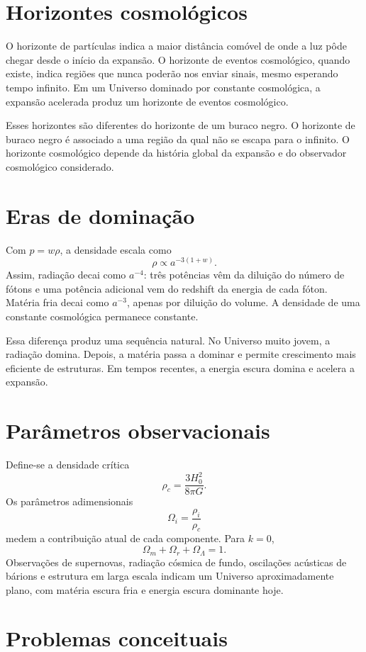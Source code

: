 \documentclass[12pt,a4paper,oneside]{book}
\theoremstyle{rgplain}
\theoremstyle{rgremark}
\begin{document}
\section{Horizontes cosmológicos}

O horizonte de partículas indica a maior distância comóvel de onde a luz pôde
chegar desde o início da expansão. O horizonte de eventos cosmológico, quando
existe, indica regiões que nunca poderão nos enviar sinais, mesmo esperando
tempo infinito. Em um Universo dominado por constante cosmológica, a expansão
acelerada produz um horizonte de eventos cosmológico.

Esses horizontes são diferentes do horizonte de um buraco negro. O horizonte de
buraco negro é associado a uma região da qual não se escapa para o infinito. O
horizonte cosmológico depende da história global da expansão e do observador
cosmológico considerado.

\section{Eras de dominação}

Com $p=w\rho$, a densidade escala como
\[
  \rho\propto a^{-3(1+w)}.
\]
Assim, radiação decai como $a^{-4}$: três potências vêm da diluição do número
de fótons e uma potência adicional vem do redshift da energia de cada fóton.
Matéria fria decai como $a^{-3}$, apenas por diluição do volume. A densidade de
uma constante cosmológica permanece constante.

Essa diferença produz uma sequência natural. No Universo muito jovem, a
radiação domina. Depois, a matéria passa a dominar e permite crescimento mais
eficiente de estruturas. Em tempos recentes, a energia escura domina e acelera
a expansão.

\section{Parâmetros observacionais}

Define-se a densidade crítica
\[
  \rho_c=\frac{3H_0^2}{8\pi G}.
\]
Os parâmetros adimensionais
\[
  \Omega_i=\frac{\rho_i}{\rho_c}
\]
medem a contribuição atual de cada componente. Para $k=0$,
\[
  \Omega_m+\Omega_r+\Omega_\Lambda=1.
\]
Observações de supernovas, radiação cósmica de fundo, oscilações acústicas de
bárions e estrutura em larga escala indicam um Universo aproximadamente plano,
com matéria escura fria e energia escura dominante hoje.

\section{Problemas conceituais}
\end{document}
